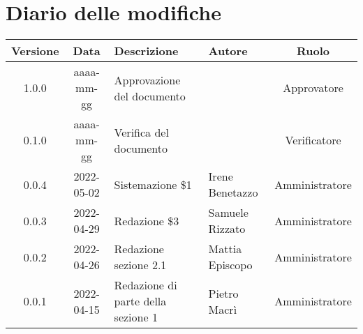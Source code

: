 \section*{Diario delle modifiche}
	\begin{center}
	\renewcommand{\arraystretch}{1.8} %
	\begin{tabular}{ |c|c|m{12em}|m{7em}|c| }
		\hline
		\textbf{Versione} & \textbf{Data} & \textbf{Descrizione} &  \textbf{Autore} &  \textbf{Ruolo} \\
		\hline
		1.0.0 & aaaa-mm-gg & Approvazione del documento & \docApprovazione & Approvatore\\
		\hline
		0.1.0 & aaaa-mm-gg & Verifica del documento & \docVerificatori & Verificatore\\
		\hline
		0.0.4 & 2022-05-02 & Sistemazione \$1 & Irene Benetazzo & Amministratore\\
		\hline
		0.0.3 & 2022-04-29 & Redazione \$3 & Samuele \newline Rizzato & Amministratore\\
		\hline
		0.0.2 & 2022-04-26 & Redazione sezione 2.1 & Mattia \newline Episcopo & Amministratore\\
		\hline
		0.0.1 & 2022-04-15 & Redazione di parte della sezione 1 & Pietro Macrì & Amministratore\\
		\hline
	\end{tabular}
	\end{center}
	\newpage